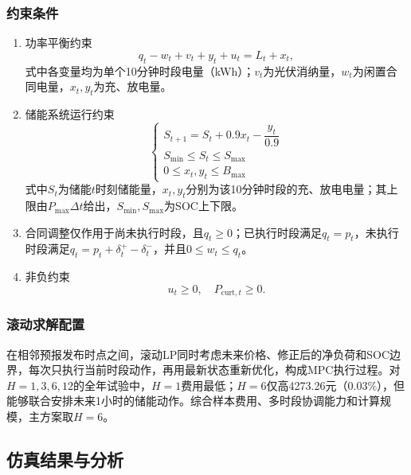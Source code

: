 \subsubsection{约束条件}
\begin{enumerate}
\item 功率平衡约束
\begin{equation}
q_t-w_t+v_t+y_t+u_t=L_t+x_t,
\label{eq:q3_power_balance}
\end{equation}
式中各变量均为单个10分钟时段电量（kWh）；$v_t$为光伏消纳量，$w_t$为闲置合同电量，$x_t,y_t$为充、放电量。
\item 储能系统运行约束
\begin{equation}
\begin{cases}
S_{t+1}=S_t+0.9x_t-\dfrac{y_t}{0.9}\\
S_{\min}\le S_t\le S_{\max}\\
0\le x_t,y_t\le B_{\max}
\end{cases}
\label{eq:q3_bess}
\end{equation}
式中$S_t$为储能$t$时刻储能量，$x_t,y_t$分别为该10分钟时段的充、放电电量；其上限由$P_{\max}\Delta t$给出，$S_{\min},S_{\max}$为SOC上下限。
\item 合同调整仅作用于尚未执行时段，且$q_t\ge0$；已执行时段满足$q_t=p_t$，未执行时段满足$q_t=p_t+\delta_t^+-\delta_t^-$，并且$0\le w_t\le q_t$。
\item 非负约束
\begin{equation}
u_t\ge0,\quad P_{\mathrm{curt},t}\ge0.
\label{eq:q3_nonneg}
\end{equation}
\end{enumerate}

\subsubsection{滚动求解配置}
在相邻预报发布时点之间，滚动LP同时考虑未来价格、修正后的净负荷和SOC边界，每次只执行当前时段动作，再用最新状态重新优化，构成MPC执行过程\cite{parisio2016stochasticmpc}。对$H=1,3,6,12$的全年试验中，$H=1$费用最低；$H=6$仅高4273.26元（$0.03\%$），但能够联合安排未来1小时的储能动作。综合样本费用、多时段协调能力和计算规模，主方案取$H=6$。

\subsection{仿真结果与分析}
